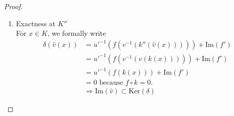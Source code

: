 \documentclass[11pt]{article}
\newcommand{\Lrta}{\Longrightarrow}
\newcommand{\lrta}{\longrightarrow}
\newcommand{\downmapsto}{\rotatebox[origin=c]{-90}{$\scriptstyle\mapsto$}\mkern2mu}
\begin{document}
\begin{proof}
\begin{enumerate}
\[\begin{tikzcd}
{|- (Z) \tikztonodes
-| ([xshift=-12ex]\tikztotarget.west)
-- (\tikztotarget)}
] 
& 
\\
0\arrow[r]  
& M'  \arrow[r,"u"]\arrow[d,"f'"] 
& M\arrow[r,"v"] \arrow[d,"f"] \arrow[phantom]{r}[red, yshift=-1.5 ex]{\substack{\exists y\ \mapsto\ x}} \arrow[phantom]{d}[red, xshift=-2 ex]{\substack{y\\[0.5\jot]\downmapsto\\[0.5\jot] f(y)}}
& M''\arrow[r] \arrow[d,"f''"] 
& 0 
\\
0\arrow[r]  
& N'  \arrow[r,"u'"] \arrow[d,"q'",two heads] \arrow[phantom]{r}[red, yshift=-1.5 ex]{\substack{\exists z\ \mapsto\ f(y)}} \arrow[phantom]{d}[red, xshift=-2 ex]{\substack{z\\[0.5\jot]\downmapsto\\[0.5\jot] [z]}}
& N\arrow[r,"v'"] \arrow[d,"q",two heads]
& N''\arrow[r]\arrow[d,"q''",two heads]  
& 0 
\\
& C'  \arrow[r,"\bar{u}"] 
& C\arrow[r,"\bar{v}"] 
& C''\arrow[r]  
& 0,
\end{tikzcd}
\]
For an element $x\in K''$, $k''(x)=x\in M''$ and $f''(x)=0$. $\because v$ is surjective, $\therefore \exists y\in M $ s.t. $v(y)=x$. Then $f''(x)=f''(v(y))=v'(f(y))=0$ $\Lrta f(y)\in \text{Ker}(v')=\text{Im}(u')$. Therefore, there exists $z\in N'$ s.t. $u'(z)=f(y)$. The choice of $z$ is unique once we fix $y$, because $u'$ is injective. \textbf{We define $\delta:K''\lrta C', x\mapsto [z]=z+\text{Im}(f')$}. For $\delta$ to be well defined, it can not depend on the choice of $y$ and $z$. Choose another $\tilde{y}\in M$ and corresponding $\tilde{z}\in N'$ s.t. $v(\tilde{y})=x$ and $u'(\tilde{z})=f(\tilde{y})$. We have $v(\tilde{y}-y)=0$, $\exists w\in M'$ s.t. $u(w)=\tilde{y}-y$. Then $f(u(w))=u'(f'(w))=f(\tilde{y}-y)=f(\tilde{y})-f(y)$. Then we have $u'(\tilde{z})-u'(z)=u'(f'(w))$. Since $u'$ is injective, we have $\tilde{z}=z+f'(w)$, thus $\tilde{z}+\text{Im}(f')=z+\text{Im}(f')$.  Then we conclude that $\delta$ is well defined.
\item Exactness at $K''$\\
For $x\in K$, we formally write
$$
\begin{aligned}
\delta(\hat{v}(x))&=u'^{-1}(f(v^{-1}(k''(\hat{v}(x)))))+\text{Im}(f')\\
&=u'^{-1}(f(v^{-1}(v(k(x)))))+\text{Im}(f')\\
&=u'^{-1}(f(k(x)))+\text{Im}(f')\\
&=0 \text{ because } f\circ k=0.\\
&\Lrta \text{Im}(\hat{v})\subset \text{Ker}(\delta)

\end{aligned}$$
\end{enumerate}
\end{proof}
\end{document}
